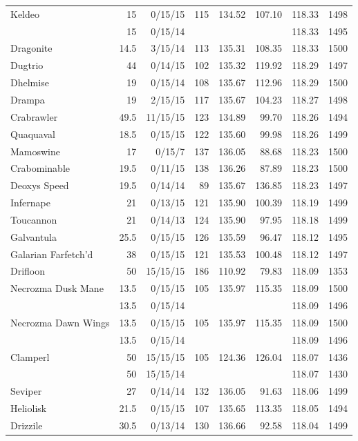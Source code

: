 \begin{longtable}{lrrrrrrr}
Keldeo & 15 & 0/15/15 & 115 & 134.52 & 107.10 & 118.33 & 1498\\
 & 15 & 0/15/14 & & & & 118.33 & 1495\\
Dragonite & 14.5 & 3/15/14 & 113 & 135.31 & 108.35 & 118.33 & 1500\\
Dugtrio & 44 & 0/14/15 & 102 & 135.32 & 119.92 & 118.29 & 1497\\
Dhelmise & 19 & 0/15/14 & 108 & 135.67 & 112.96 & 118.29 & 1500\\
Drampa & 19 & 2/15/15 & 117 & 135.67 & 104.23 & 118.27 & 1498\\
Crabrawler & 49.5 & 11/15/15 & 123 & 134.89 & 99.70 & 118.26 & 1494\\
Quaquaval & 18.5 & 0/15/15 & 122 & 135.60 & 99.98 & 118.26 & 1499\\
Mamoswine & 17 & 0/15/7 & 137 & 136.05 & 88.68 & 118.23 & 1500\\
Crabominable & 19.5 & 0/11/15 & 138 & 136.26 & 87.89 & 118.23 & 1500\\
Deoxys Speed & 19.5 & 0/14/14 & 89 & 135.67 & 136.85 & 118.23 & 1497\\
Infernape & 21 & 0/13/15 & 121 & 135.90 & 100.39 & 118.19 & 1499\\
Toucannon & 21 & 0/14/13 & 124 & 135.90 & 97.95 & 118.18 & 1499\\
Galvantula & 25.5 & 0/15/15 & 126 & 135.59 & 96.47 & 118.12 & 1495\\
Galarian Farfetch'd & 38 & 0/15/15 & 121 & 135.53 & 100.48 & 118.12 & 1497\\
Drifloon & 50 & 15/15/15 & 186 & 110.92 & 79.83 & 118.09 & 1353\\
Necrozma Dusk Mane & 13.5 & 0/15/15 & 105 & 135.97 & 115.35 & 118.09 & 1500\\
 & 13.5 & 0/15/14 & & & & 118.09 & 1496\\
Necrozma Dawn Wings & 13.5 & 0/15/15 & 105 & 135.97 & 115.35 & 118.09 & 1500\\
 & 13.5 & 0/15/14 & & & & 118.09 & 1496\\
Clamperl & 50 & 15/15/15 & 105 & 124.36 & 126.04 & 118.07 & 1436\\
 & 50 & 15/15/14 & & & & 118.07 & 1430\\
Seviper & 27 & 0/14/14 & 132 & 136.05 & 91.63 & 118.06 & 1499\\
Heliolisk & 21.5 & 0/15/15 & 107 & 135.65 & 113.35 & 118.05 & 1494\\
Drizzile & 30.5 & 0/13/14 & 130 & 136.66 & 92.58 & 118.04 & 1499\\

\end{longtable}

